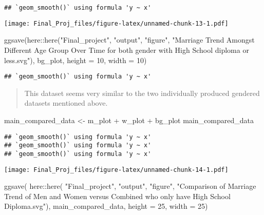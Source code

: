 \documentclass[
]{article}
\newenvironment{Shaded}{\begin{snugshade}}{\end{snugshade}}
\newcommand{\AttributeTok}[1]{\textcolor[rgb]{0.77,0.63,0.00}{#1}}
\newcommand{\DecValTok}[1]{\textcolor[rgb]{0.00,0.00,0.81}{#1}}
\newcommand{\FunctionTok}[1]{\textcolor[rgb]{0.00,0.00,0.00}{#1}}
\newcommand{\NormalTok}[1]{#1}
\newcommand{\OtherTok}[1]{\textcolor[rgb]{0.56,0.35,0.01}{#1}}
\newcommand{\SpecialCharTok}[1]{\textcolor[rgb]{0.00,0.00,0.00}{#1}}
\newcommand{\StringTok}[1]{\textcolor[rgb]{0.31,0.60,0.02}{#1}}
\begin{document}
\begin{verbatim}
## `geom_smooth()` using formula 'y ~ x'
\end{verbatim}

\texttt{[image: Final\_Proj\_files/figure-latex/unnamed-chunk-13-1.pdf]}

\begin{Shaded}
\begin{Highlighting}[]
\FunctionTok{ggsave}\NormalTok{(here}\SpecialCharTok{::}\FunctionTok{here}\NormalTok{(}\StringTok{"Final\_project"}\NormalTok{,}
                  \StringTok{"output"}\NormalTok{,}
                  \StringTok{"figure"}\NormalTok{,}
                  \StringTok{"Marriage Trend Amongst Different Age Group Over Time for both gender with High School diploma or less.svg"}\NormalTok{),}
\NormalTok{       bg\_plot,}
       \AttributeTok{height =} \DecValTok{10}\NormalTok{,}
       \AttributeTok{width =} \DecValTok{10}\NormalTok{)}
\end{Highlighting}
\end{Shaded}

\begin{verbatim}
## `geom_smooth()` using formula 'y ~ x'
\end{verbatim}

\begin{quote}
This dataset seems very similar to the two individually produced
gendered datasets mentioned above.
\end{quote}

\begin{Shaded}
\begin{Highlighting}[]
\NormalTok{main\_compared\_data }\OtherTok{\textless{}{-}}\NormalTok{ m\_plot }\SpecialCharTok{+}\NormalTok{ w\_plot }\SpecialCharTok{+}\NormalTok{ bg\_plot}
\NormalTok{main\_compared\_data}
\end{Highlighting}
\end{Shaded}

\begin{verbatim}
## `geom_smooth()` using formula 'y ~ x'
## `geom_smooth()` using formula 'y ~ x'
## `geom_smooth()` using formula 'y ~ x'
\end{verbatim}

\texttt{[image: Final\_Proj\_files/figure-latex/unnamed-chunk-14-1.pdf]}

\begin{Shaded}
\begin{Highlighting}[]
\FunctionTok{ggsave}\NormalTok{(}
\NormalTok{  here}\SpecialCharTok{::}\FunctionTok{here}\NormalTok{(}
    \StringTok{"Final\_project"}\NormalTok{,}
    \StringTok{"output"}\NormalTok{,}
    \StringTok{"figure"}\NormalTok{,}
    \StringTok{"Comparison of Marriage Trend of Men and Women versus Combined who only have High School Diploma.svg"}\NormalTok{),}
\NormalTok{  main\_compared\_data,}
  \AttributeTok{height =} \DecValTok{25}\NormalTok{,}
  \AttributeTok{width =} \DecValTok{25}\NormalTok{)}
\end{Highlighting}
\end{Shaded}
\end{document}
